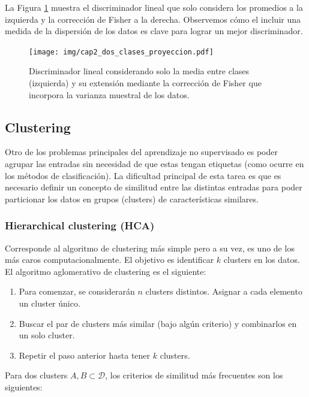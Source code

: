 La Figura \ref{fig:ej_fda} muestra el  discriminador lineal que solo considera los promedios a la  izquierda y la corrección de Fisher a la derecha. Observemos cómo el incluir una medida de la dispersión de los datos es clave para lograr un mejor discriminador.

\begin{figure}[H]
	\centering
	\texttt{[image: img/cap2\_dos\_clases\_proyeccion.pdf]}
	\caption{Discriminador lineal considerando solo la media entre clases (izquierda) y  su extensión mediante la corrección de Fisher que incorpora la varianza muestral de los datos.}
	\label{fig:ej_fda}
\end{figure}

\subsection{Clustering}

Otro de los problemas principales del aprendizaje no supervisado es poder agrupar las entradas sin necesidad de que estas tengan etiquetas (como ocurre en los métodos de clasificación). La dificultad principal de esta tarea es que es necesario definir un concepto de similitud entre las distintas entradas para poder particionar los datos en grupos (clusters) de características similares.

\subsubsection{Hierarchical clustering (HCA)}

Corresponde al algoritmo de clustering más simple pero a su vez, es uno de los más caros computacionalmente. El objetivo es identificar $k$ clusters en los datos.\\

 El algoritmo aglomerativo de clustering es el siguiente:

\begin{enumerate}
	\item Para comenzar, se considerarán $n$ clusters distintos. Asignar a cada elemento un cluster único.
	\item Buscar el par de clusters más similar (bajo algún criterio) y combinarlos en un solo cluster.
	\item Repetir el paso anterior hasta tener $k$ clusters.
\end{enumerate}

Para dos clusters $A,B\subset\mathcal{D}$, los criterios de similitud más frecuentes son los siguientes:

